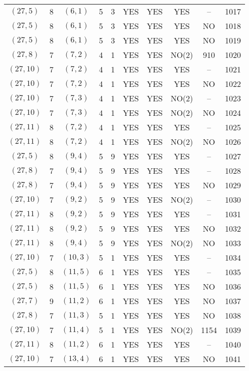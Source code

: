 \begin{longtable}{|c|c|c|c|c|c|c|c|c|c|}
$(27, 5)$ & 8 & $(6, 1)$ & 5 & 3 & YES & YES & YES & -- & 1017\\
$(27, 5)$ & 8 & $(6, 1)$ & 5 & 3 & YES & YES & YES & NO & 1018\\
$(27, 5)$ & 8 & $(6, 1)$ & 5 & 3 & YES & YES & YES & NO & 1019\\
$(27, 8)$ & 7 & $(7, 2)$ & 4 & 1 & YES & YES & NO(2) & 910 & 1020\\
$(27, 10)$ & 7 & $(7, 2)$ & 4 & 1 & YES & YES & YES & -- & 1021\\
$(27, 10)$ & 7 & $(7, 2)$ & 4 & 1 & YES & YES & YES & NO & 1022\\
$(27, 10)$ & 7 & $(7, 3)$ & 4 & 1 & YES & YES & NO(2) & -- & 1023\\
$(27, 10)$ & 7 & $(7, 3)$ & 4 & 1 & YES & YES & NO(2) & NO & 1024\\
$(27, 11)$ & 8 & $(7, 2)$ & 4 & 1 & YES & YES & YES & -- & 1025\\
$(27, 11)$ & 8 & $(7, 2)$ & 4 & 1 & YES & YES & NO(2) & NO & 1026\\
$(27, 5)$ & 8 & $(9, 4)$ & 5 & 9 & YES & YES & YES & -- & 1027\\
$(27, 8)$ & 7 & $(9, 4)$ & 5 & 9 & YES & YES & YES & -- & 1028\\
$(27, 8)$ & 7 & $(9, 4)$ & 5 & 9 & YES & YES & YES & NO & 1029\\
$(27, 10)$ & 7 & $(9, 2)$ & 5 & 9 & YES & YES & NO(2) & -- & 1030\\
$(27, 11)$ & 8 & $(9, 2)$ & 5 & 9 & YES & YES & YES & -- & 1031\\
$(27, 11)$ & 8 & $(9, 2)$ & 5 & 9 & YES & YES & YES & NO & 1032\\
$(27, 11)$ & 8 & $(9, 4)$ & 5 & 9 & YES & YES & NO(2) & NO & 1033\\
$(27, 10)$ & 7 & $(10, 3)$ & 5 & 1 & YES & YES & YES & -- & 1034\\
$(27, 5)$ & 8 & $(11, 5)$ & 6 & 1 & YES & YES & YES & -- & 1035\\
$(27, 5)$ & 8 & $(11, 5)$ & 6 & 1 & YES & YES & YES & NO & 1036\\
$(27, 7)$ & 9 & $(11, 2)$ & 6 & 1 & YES & YES & YES & NO & 1037\\
$(27, 8)$ & 7 & $(11, 3)$ & 5 & 1 & YES & YES & YES & NO & 1038\\
$(27, 10)$ & 7 & $(11, 4)$ & 5 & 1 & YES & YES & NO(2) & 1154 & 1039\\
$(27, 11)$ & 8 & $(11, 2)$ & 6 & 1 & YES & YES & YES & -- & 1040\\
$(27, 10)$ & 7 & $(13, 4)$ & 6 & 1 & YES & YES & YES & NO & 1041\\

\end{longtable}
